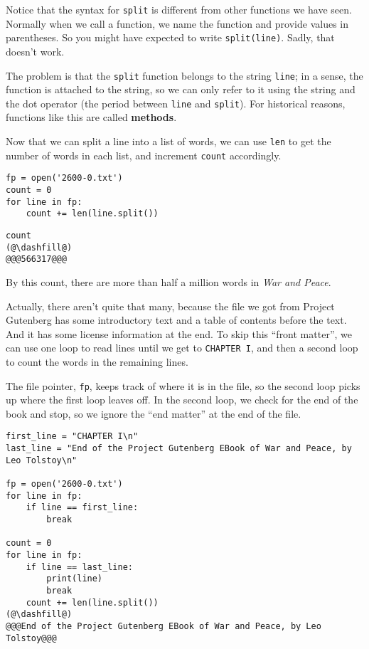 Notice that the syntax for \passthrough{\lstinline!split!} is different
from other functions we have seen. Normally when we call a function, we
name the function and provide values in parentheses. So you might have
expected to write \passthrough{\lstinline!split(line)!}. Sadly, that
doesn't work.

The problem is that the \passthrough{\lstinline!split!} function belongs
to the string \passthrough{\lstinline!line!}; in a sense, the function
is attached to the string, so we can only refer to it using the string
and the dot operator (the period between \passthrough{\lstinline!line!}
and \passthrough{\lstinline!split!}). For historical reasons, functions
like this are called \textbf{methods}.

Now that we can split a line into a list of words, we can use
\passthrough{\lstinline!len!} to get the number of words in each list,
and increment \passthrough{\lstinline!count!} accordingly.

\begin{lstlisting}[]
fp = open('2600-0.txt')
count = 0
for line in fp:
    count += len(line.split())
\end{lstlisting}

\begin{lstlisting}[]
count
(@\dashfill@)
@@@566317@@@
\end{lstlisting}

By this count, there are more than half a million words in \emph{War and
Peace}.

Actually, there aren't quite that many, because the file we got from
Project Gutenberg has some introductory text and a table of contents
before the text. And it has some license information at the end. To skip
this ``front matter'', we can use one loop to read lines until we get to
\passthrough{\lstinline!CHAPTER I!}, and then a second loop to count the
words in the remaining lines.

The file pointer, \passthrough{\lstinline!fp!}, keeps track of where it
is in the file, so the second loop picks up where the first loop leaves
off. In the second loop, we check for the end of the book and stop, so
we ignore the ``end matter'' at the end of the file.

\begin{lstlisting}[]
first_line = "CHAPTER I\n"
last_line = "End of the Project Gutenberg EBook of War and Peace, by Leo Tolstoy\n"

fp = open('2600-0.txt')
for line in fp:
    if line == first_line:
        break

count = 0
for line in fp:
    if line == last_line:
        print(line)
        break
    count += len(line.split())
(@\dashfill@)
@@@End of the Project Gutenberg EBook of War and Peace, by Leo Tolstoy@@@
\end{lstlisting}


